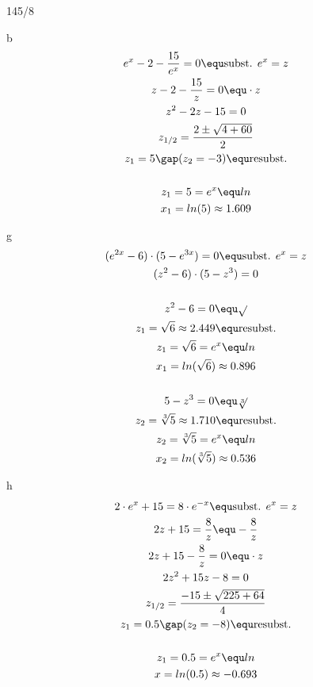 \begin{exercise}{145/8}
  \item [b]
  \begin{gather*}
    e^x - 2 - \frac{15}{e^x} = 0 \equ \text{subst. } e^x = z \\
    z - 2 - \frac{15}{z} = 0 \equ \cdot z \\
    z^2 - 2z - 15 = 0 \\
    z_{1/2} = \frac{2 \pm \sqrt{4 + 60}}{2} \\
    z_1 = 5 \gap (z_2 = -3) \equ \text{resubst.} \\\\
    z_1 = 5 = e^x \equ ln \\
    x_1 = ln(5) \approx 1.609
  \end{gather*}
  \item [g]
  \begin{gather*}
    (e^{2x} - 6) \cdot (5 - e^{3x}) = 0 \equ \text{subst. } e^x = z \\
    (z^2 - 6) \cdot (5 - z^3) = 0 \\\\
    z^2 - 6 = 0 \equ \sqrt{} \\
    z_1 = \sqrt{6} \approx 2.449 \equ \text{resubst.} \\
    z_1 = \sqrt{6} = e^x \equ ln \\
    x_1 = ln(\sqrt{6}) \approx 0.896 \\\\
    5 - z^3 = 0 \equ \sqrt[3]{} \\
    z_2 = \sqrt[3]{5} \approx 1.710 \equ \text{resubst.} \\
    z_2 = \sqrt[3]{5} = e^x \equ ln \\
    x_2 = ln(\sqrt[3]{5}) \approx 0.536
  \end{gather*}
  \item [h]
  \begin{gather*}
    2 \cdot e^x + 15 = 8 \cdot e^{-x} \equ \text{subst. } e^x = z \\
    2z + 15 = \frac{8}{z} \equ -\frac{8}{z} \\
    2z + 15 - \frac{8}{z} = 0 \equ \cdot z \\
    2z^2 + 15z - 8 = 0 \\
    z_{1/2} = \frac{-15 \pm \sqrt{225 + 64}}{4} \\
    z_1 = 0.5 \gap (z_2 = -8) \equ \text{resubst.} \\\\
    z_1 = 0.5 = e^x \equ ln \\
    x = ln(0.5) \approx -0.693
  \end{gather*}
\end{exercise}

